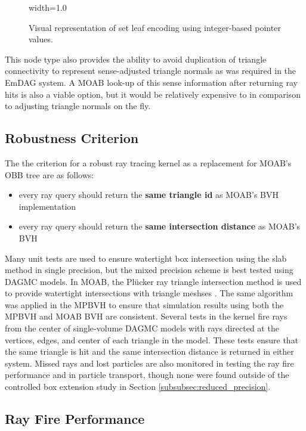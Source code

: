 \begin{figure}
  {width=1.0\textwidth}
  \caption[Graphic of surface root node encoding.]{Visual representation of set
    leaf encoding using integer-based pointer values.}
  \label{fig:set_leaf_encoding}
\end{figure}

This node type also provides the ability to avoid duplication of triangle
connectivity to represent sense-adjusted triangle normals as was required in the
EmDAG system. A MOAB look-up of this sense information after returning ray hits
is also a viable option, but it would be relatively expensive to in comparison
to adjusting triangle normals on the fly.

\subsection{Robustness Criterion}

The the criterion for a robust ray tracing kernel as a replacement for MOAB's
OBB tree are as follows:

\begin{itemize}
  \item every ray query should return the \textbf{same triangle id} as MOAB's BVH
    implementation
  \item every ray query should return the \textbf{same intersection distance} as MOAB's BVH
\end{itemize}

Many unit tests are used to ensure watertight box intersection using the slab
method \cite{Kay_1986} in single precision, but the mixed precision scheme is
best tested using DAGMC models. In MOAB, the Pl\"{u}cker ray triangle
intersection method is used to provide watertight intersections with triangle
meshses \cite{Platis_2003}. The same algorithm was applied in the MPBVH to
ensure that simulation results using both the MPBVH and MOAB BVH are
consistent. Several tests in the kernel fire rays from the center of
single-volume DAGMC models with rays directed at the vertices, edges, and center
of each triangle in the model. These tests ensure that the same triangle is hit
and the same intersection distance is returned in either
system. Missed rays and lost particles are also monitored in testing the ray fire
performance and in particle transport, though none were found outside of the
controlled box extension study in Section \ref{subsubsec:reduced_precision}.

\subsection{Ray Fire Performance}\label{sec:mpbvh_rf_perf}

